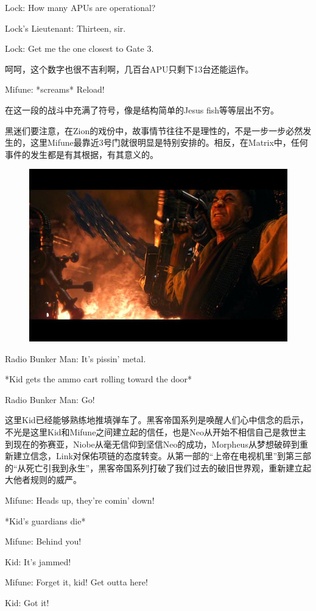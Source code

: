 \documentclass[UTF8]{ctexart}
\newenvironment{myquote}{\color{green} \setlength{\leftskip}{6em} \setlength{\rightskip}{4em} \setlength{\parindent}{-2em}}{\par}
\begin{document}
\begin{myquote}
Lock: How many APUs are operational?

Lock's Lieutenant: Thirteen, sir.

Lock: Get me the one closest to Gate 3.
\end{myquote}

呵呵，这个数字也很不吉利啊，几百台APU只剩下13台还能运作。

\begin{myquote}
Mifune: *screams* Reload!
\end{myquote}

在这一段的战斗中充满了符号，像是结构简单的Jesus fish等等层出不穷。

黑迷们要注意，在Zion的戏份中，故事情节往往不是理性的，不是一步一步必然发生的，这里Mifune最靠近3号门就很明显是特别安排的。相反，在Matrix中，任何事件的发生都是有其根据，有其意义的。

\begin{figure}[htb]
\centering
\includegraphics[width=0.5\linewidth]{fig/b3f558eed0a8eefbb3fb954d.jpg}
\end{figure}

\begin{myquote}
Radio Bunker Man: It's pissin' metal.

*Kid gets the ammo cart rolling toward the door*

Radio Bunker Man: Go!
\end{myquote}

这里Kid已经能够熟练地推填弹车了。黑客帝国系列是唤醒人们心中信念的启示，不光是这里Kid和Mifune之间建立起的信任，也是Neo从开始不相信自己是救世主到现在的弥赛亚，Niobe从毫无信仰到坚信Neo的成功，Morpheus从梦想破碎到重新建立信念，Link对保佑项链的态度转变。从第一部的“上帝在电视机里”到第三部的“从死亡引我到永生”，黑客帝国系列打破了我们过去的破旧世界观，重新建立起大他者规则的威严。

\begin{myquote}
Mifune: Heads up, they're comin' down!

*Kid's guardians die*

Mifune: Behind you!

Kid: It's jammed!

Mifune: Forget it, kid! Get outta here!

Kid: Got it!
\end{myquote}
\end{document}
